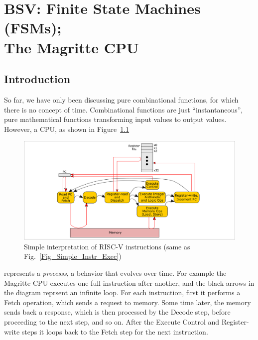 

\chapter{BSV: Finite State Machines (FSMs); \\
The Magritte CPU}


\setcounter{page}{1}
\renewcommand{\thepage}{\arabic{chapter}-\arabic{page}}

\label{ch_FSMs}


\section{Introduction}

So far, we have only been discussing pure combinational functions, for
which there is no concept of time.  Combinational functions are just
``instantaneous'', pure mathematical functions transforming input
values to output values.  However, a CPU, as shown in
Figure~\ref{Fig_FSMs_Simple_Instr_Exec}
\begin{figure}[htbp]
  \centerline{\includegraphics[width=6in,angle=0]{ch030_RISCV_Design_Space/Figures/Fig_Simple_Instr_Exec}}
  \caption{\label{Fig_FSMs_Simple_Instr_Exec}Simple interpretation of RISC-V instructions (same as Fig.~\ref{Fig_Simple_Instr_Exec})}
\end{figure}
represents a \emph{processs}, a behavior that evolves over time.  For
example the Magritte CPU executes one full instruction after another,
and the black arrows in the diagram reprsent an infinite loop. For
each instruction, first it performs a Fetch operation, which sends a
request to memory. Some time later, the memory sends back a response,
which is then processed by the Decode step, before proceeding to the
next step, and so on.  After the Execute Control and Register-write
steps it loops back to the Fetch step for the next instruction.

